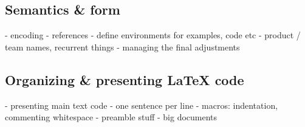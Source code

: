 \documentclass[a4paper,twoside,nofonts]{tufte-handout}
\begin{document}
\subsection{Semantics \& form} %
\label{sub:semantics}

\begin{todoenv}
    - encoding
    - references
    - define environments for examples, code etc
    - product / team names, recurrent things
    - managing the final adjustments
\end{todoenv}

\subsection{Organizing \& presenting \LaTeX{} code} %
\label{sub:format}

\begin{todoenv}
    - presenting main text code
    - one sentence per line
    - macros: indentation, commenting whitespace
    - preamble stuff
    - big documents
\end{todoenv}




\nocite{*}


\clearpage\todos
\end{document}
